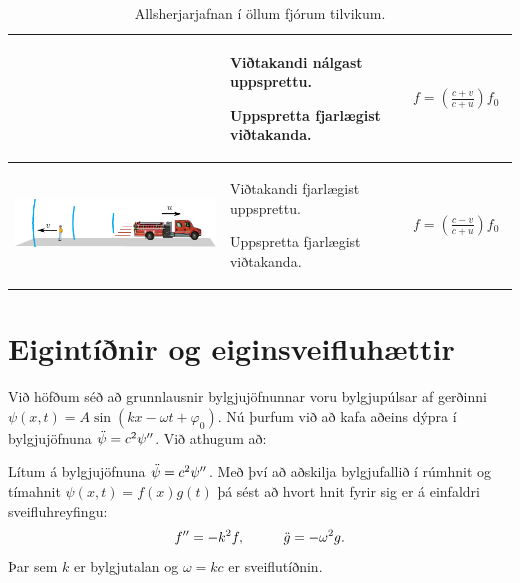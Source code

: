 \begin{table}[h!]
\begin{tabular}{ | c | m{5.2cm} | m{2.5cm} | }
\begin{minipage}{.4\textwidth}
    \vspace{0.3cm}
    \end{minipage}
    &
      Viðtakandi nálgast uppsprettu. \par Uppspretta fjarlægist viðtakanda.
    & 
      \begin{align*}
          f = \left( \frac{c + v}{c + u} \right)f_0
      \end{align*}
    \\ \hline
    \begin{minipage}{.4\textwidth}
    \vspace{0.3cm}
    \centering
      \includegraphics[width=0.95\linewidth]{figures/doppler-tilvik34.pdf}
    \vspace{0.3cm}
    \end{minipage}
    &
      Viðtakandi fjarlægist uppsprettu. \par Uppspretta fjarlægist viðtakanda.
    & 
      \begin{align*}
          f = \left( \frac{c - v}{c + u} \right)f_0
      \end{align*}
    \\ \hline
  \end{tabular}
  \caption{Allsherjarjafnan í öllum fjórum tilvikum.} \label{table:hverfi}
\end{table}

\newpage

\section{Eigintíðnir og eiginsveifluhættir}

Við höfðum séð að grunnlausnir bylgjujöfnunnar voru bylgjupúlsar af gerðinni $\psi(x,t) = A\sin(kx-\omega t + \varphi_0)$. Nú þurfum við að kafa aðeins dýpra í bylgjujöfnuna $\Ddot{\psi} = c^2\psi''$. Við athugum að:
\begin{tcolorbox}
\begin{theorem}
Lítum á bylgjujöfnuna $\Ddot{\psi} = c^2\psi''$. Með því að aðskilja bylgjufallið í rúmhnit og tímahnit $\psi(x,t) = f(x)g(t)$ þá sést að hvort hnit fyrir sig er á einfaldri sveifluhreyfingu:
\begin{align*}
    f'' = -k^2f, \hspace{1cm} \Ddot{g} = -\omega^2g.
\end{align*}
Þar sem $k$ er bylgjutalan og $\omega = kc$ er sveiflutíðnin.
\end{theorem}
\end{tcolorbox}

